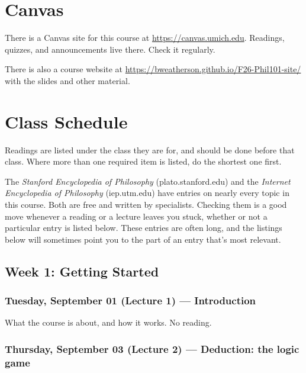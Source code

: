\documentclass[
  letterpaper,
  DIV=11,
  numbers=noendperiod]{scrartcl}
\begin{document}
\section{Canvas}\label{canvas}

There is a Canvas site for this course at
\url{https://canvas.umich.edu}. Readings, quizzes, and announcements
live there. Check it regularly.

There is also a course website at
\url{https://bweatherson.github.io/F26-Phil101-site/} with the slides
and other material.

\pagebreak

\section{Class Schedule}\label{class-schedule}

Readings are listed under the class they are for, and should be done
before that class. Where more than one required item is listed, do the
shortest one first.

The \emph{Stanford Encyclopedia of Philosophy} (plato.stanford.edu) and
the \emph{Internet Encyclopedia of Philosophy} (iep.utm.edu) have
entries on nearly every topic in this course. Both are free and written
by specialists. Checking them is a good move whenever a reading or a
lecture leaves you stuck, whether or not a particular entry is listed
below. These entries are often long, and the listings below will
sometimes point you to the part of an entry that's most relevant.

\subsection{Week 1: Getting Started}\label{week-1-getting-started}

\subsubsection{Tuesday, September 01 (Lecture 1) ---
Introduction}\label{tuesday-september-01-lecture-1-introduction}

What the course is about, and how it works. No reading.

\subsubsection{Thursday, September 03 (Lecture 2) --- Deduction: the
logic
game}\label{thursday-september-03-lecture-2-deduction-the-logic-game}
\end{document}

